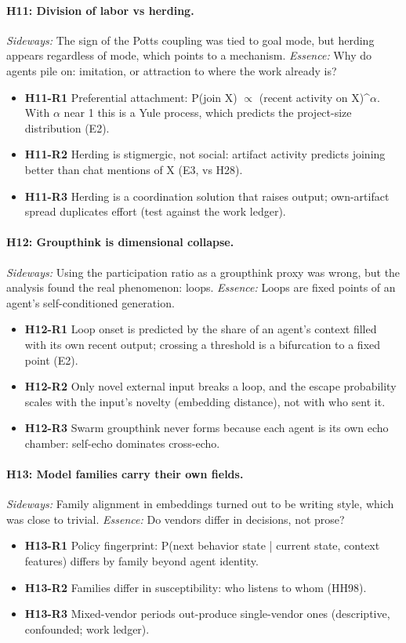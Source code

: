 \documentclass[aps,pre,reprint,10pt,nofootinbib]{revtex4-2}
\begin{document}
\paragraph{H11: Division of labor vs herding.} \emph{Sideways:} The sign of the Potts coupling was tied to goal mode, but herding appears regardless of mode, which points to a mechanism. \emph{Essence:} Why do agents pile on: imitation, or attraction to where the work already is?
\begin{itemize}\setlength{\itemsep}{0pt}
\item \textbf{H11-R1} Preferential attachment: P(join X) $\propto$ (recent activity on X)\textasciicircum{}$\alpha$. With $\alpha$ near 1 this is a Yule process, which predicts the project-size distribution (E2).
\item \textbf{H11-R2} Herding is stigmergic, not social: artifact activity predicts joining better than chat mentions of X (E3, vs H28).
\item \textbf{H11-R3} Herding is a coordination solution that raises output; own-artifact spread duplicates effort (test against the work ledger).
\end{itemize}
\paragraph{H12: Groupthink is dimensional collapse.} \emph{Sideways:} Using the participation ratio as a groupthink proxy was wrong, but the analysis found the real phenomenon: loops. \emph{Essence:} Loops are fixed points of an agent's self-conditioned generation.
\begin{itemize}\setlength{\itemsep}{0pt}
\item \textbf{H12-R1} Loop onset is predicted by the share of an agent's context filled with its own recent output; crossing a threshold is a bifurcation to a fixed point (E2).
\item \textbf{H12-R2} Only novel external input breaks a loop, and the escape probability scales with the input's novelty (embedding distance), not with who sent it.
\item \textbf{H12-R3} Swarm groupthink never forms because each agent is its own echo chamber: self-echo dominates cross-echo.
\end{itemize}
\paragraph{H13: Model families carry their own fields.} \emph{Sideways:} Family alignment in embeddings turned out to be writing style, which was close to trivial. \emph{Essence:} Do vendors differ in decisions, not prose?
\begin{itemize}\setlength{\itemsep}{0pt}
\item \textbf{H13-R1} Policy fingerprint: P(next behavior state | current state, context features) differs by family beyond agent identity.
\item \textbf{H13-R2} Families differ in susceptibility: who listens to whom (HH98).
\item \textbf{H13-R3} Mixed-vendor periods out-produce single-vendor ones (descriptive, confounded; work ledger).
\end{itemize}
\end{document}
